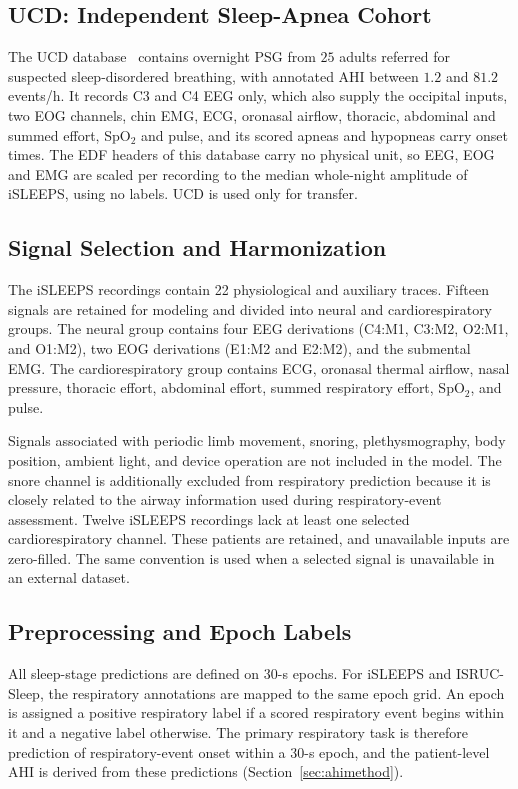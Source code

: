 \documentclass[a4paper,fleqn]{cas-sc}
\begin{document}
\subsection{UCD: Independent Sleep-Apnea Cohort}

The UCD database~\cite{ucddb2007,goldberger2000physionet} contains overnight PSG
from $25$ adults referred for suspected sleep-disordered breathing, with annotated
AHI between $1.2$ and $81.2$ events/h. It records C3 and C4 EEG only, which also
supply the occipital inputs, two EOG channels, chin EMG, ECG, oronasal airflow,
thoracic, abdominal and summed effort, SpO$_2$ and pulse, and its scored apneas
and hypopneas carry onset times. The EDF headers of this database carry no physical
unit, so EEG, EOG and EMG are scaled per recording to the median whole-night
amplitude of iSLEEPS, using no labels. UCD is used only for transfer.

\subsection{Signal Selection and Harmonization}

The iSLEEPS recordings contain 22 physiological and auxiliary traces. Fifteen
signals are retained for modeling and divided into neural and
cardiorespiratory groups. The neural group contains four EEG derivations
(C4:M1, C3:M2, O2:M1, and O1:M2), two EOG derivations (E1:M2 and E2:M2), and
the submental EMG. The cardiorespiratory group contains ECG, oronasal thermal
airflow, nasal pressure, thoracic effort, abdominal effort, summed respiratory
effort, SpO$_2$, and pulse.

Signals associated with periodic limb movement, snoring, plethysmography, body
position, ambient light, and device operation are not included in the model.
The snore channel is additionally excluded from respiratory prediction because
it is closely related to the airway information used during respiratory-event
assessment. Twelve iSLEEPS recordings lack at least one selected
cardiorespiratory channel. These patients are retained, and unavailable inputs
are zero-filled. The same
convention is used when a selected signal is unavailable in an external
dataset.


\subsection{Preprocessing and Epoch Labels}

All sleep-stage predictions are defined on 30-s epochs. For iSLEEPS and
ISRUC-Sleep, the respiratory annotations are mapped to the same epoch grid. An
epoch is assigned a positive respiratory label if a scored respiratory event begins
within it and a negative label otherwise. The primary
respiratory task is therefore prediction of respiratory-event onset within
a 30-s epoch, and the patient-level AHI is derived from these predictions
(Section~\ref{sec:ahimethod}).
\end{document}
